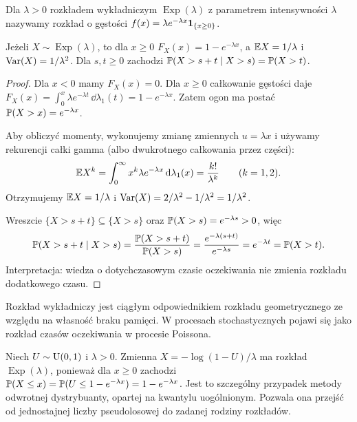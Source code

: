\begin{definicja}
Dla $\lambda>0$ rozkładem wykładniczym $\operatorname{Exp}(\lambda)$
z parametrem intensywności $\lambda$ nazywamy rozkład
o gęstości $f(x)=\lambda e^{-\lambda x}\mathbf{1}_{\{x\geq0\}}$.
\end{definicja}

\begin{stwierdzenie}
Jeżeli $X\sim\operatorname{Exp}(\lambda)$, to dla $x\geq0$
$F_X(x)=1-e^{-\lambda x}$, a
$\mathbb{E} X=1/\lambda$ i $\operatorname{Var}(X)=1/\lambda^2$.
Dla $s,t\geq0$ zachodzi
$\mathbb{P}(X>s+t\mid X>s)=\mathbb{P}(X>t)$.
\end{stwierdzenie}
\begin{proof}
Dla $x<0$ mamy $F_X(x)=0$. Dla $x\geq0$ całkowanie
gęstości daje
$F_X(x)=\int_0^x\lambda e^{-\lambda t}\,\dd\lambda_1(t)
=1-e^{-\lambda x}$.
Zatem ogon ma postać
$\mathbb{P}(X>x)=e^{-\lambda x}$.

Aby obliczyć momenty, wykonujemy zmianę zmiennych
$u=\lambda x$ i używamy rekurencji całki gamma
(albo dwukrotnego całkowania przez części):
\[
\mathbb{E} X^k=\int_0^\infty x^k\lambda e^{-\lambda x}
\,\mathrm{d}\lambda_1(x)=\frac{k!}{\lambda^k}
\qquad(k=1,2).
\]
Otrzymujemy $\mathbb{E} X=1/\lambda$ i
$\operatorname{Var}(X)=2/\lambda^2-1/\lambda^2=1/\lambda^2$.

Wreszcie $\{X>s+t\}\subseteq\{X>s\}$ oraz
$\mathbb{P}(X>s)=e^{-\lambda s}>0$, więc
\[
\mathbb{P}(X>s+t\mid X>s)
=\frac{\mathbb{P}(X>s+t)}{\mathbb{P}(X>s)}
=\frac{e^{-\lambda(s+t)}}{e^{-\lambda s}}
=e^{-\lambda t}=\mathbb{P}(X>t).
\]
Interpretacja: wiedza o dotychczasowym czasie oczekiwania
nie zmienia rozkładu dodatkowego czasu.
\end{proof}

\begin{uwaga}
Rozkład wykładniczy jest ciągłym odpowiednikiem rozkładu
geometrycznego ze względu na własność braku pamięci.
W procesach stochastycznych pojawi się jako rozkład czasów
oczekiwania w procesie Poissona.
\end{uwaga}

\begin{przyklad}
Niech $U\sim\operatorname{U}(0,1)$ i $\lambda>0$. Zmienna
$X=-\log(1-U)/\lambda$ ma rozkład $\operatorname{Exp}(\lambda)$,
ponieważ dla $x\geq0$ zachodzi
$\mathbb{P}(X\leq x)=\mathbb{P}(U\leq1-e^{-\lambda x})=1-e^{-\lambda x}$.
Jest to szczególny przypadek metody odwrotnej dystrybuanty,
opartej na kwantylu uogólnionym. Pozwala ona przejść od
jednostajnej liczby pseudolosowej do zadanej rodziny rozkładów.
\end{przyklad}

